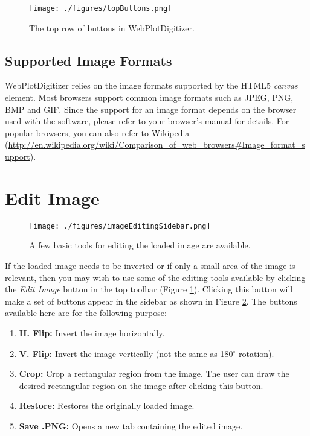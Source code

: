 \documentclass[letterpaper, 10pt]{article}
\begin{document}
\begin{figure}
\begin{center}
\texttt{[image: ./figures/topButtons.png]}
\caption{The top row of buttons in WebPlotDigitizer.}
\label{fig:topButtons}
\end{center}
\end{figure}

\subsection{Supported Image Formats}
WebPlotDigitizer relies on the image formats supported by the HTML5 \emph{canvas} element. Most browsers support common image formats such as JPEG, PNG, BMP and GIF. Since the support for an image format depends on the browser used with the software, please refer to your browser's manual for details. For popular browsers, you can also refer to Wikipedia (\url{http://en.wikipedia.org/wiki/Comparison_of_web_browsers#Image_format_support}).


\section{Edit Image}

\begin{figure}
\begin{center}
\texttt{[image: ./figures/imageEditingSidebar.png]}
\caption{A few basic tools for editing the loaded image are available.}
\label{fig:imageEditingSidebar}
\end{center}
\end{figure}
If the loaded image needs to be inverted or if only a small area of the image is relevant, then you may wish to use some of the editing tools available by clicking the \emph{Edit Image} button in the top toolbar (Figure \ref{fig:topButtons}). Clicking this button will make a set of buttons appear in the sidebar as shown in Figure \ref{fig:imageEditingSidebar}. The buttons available here are for the following purpose:
\begin{enumerate}
\item{{\bf H. Flip:} Invert the image horizontally.}
\item{{\bf V. Flip:} Invert the image vertically (not the same as 180$^{\circ}$ rotation).}
\item{{\bf Crop:} Crop a rectangular region from the image. The user can draw the desired rectangular region on the image after clicking this button.}
\item{{\bf Restore: } Restores the originally loaded image.}
\item{{\bf Save .PNG:} Opens a new tab containing the edited image.}
 
\end{enumerate}
\end{document}
